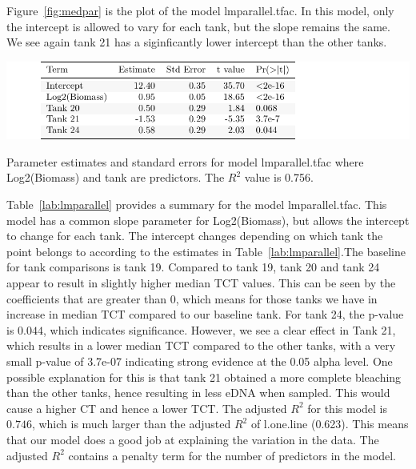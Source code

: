 Figure~\ref{fig:medpar} is the plot of the model  lmparallel.tfac. In this model, only the intercept is allowed to vary for each tank, but the slope remains the same. We see again tank 21 has a siginficantly lower intercept than the other tanks.


\vspace{5mm}

%

 \begin{table}[H]
\includegraphics{Chapter3Images/lmparallelkable.pdf}
\caption{Parameter estimates and standard errors for model  lmparallel.tfac where Log2(Biomass) and tank are predictors. The $R^{2}$ value is 0.756.}
\label{lab:lmparallel}
\end{table}



Table~\ref{lab:lmparallel} provides a summary for the model  lmparallel.tfac. This model has a common slope parameter for Log2(Biomass), but allows the intercept to change for each tank.  The intercept changes depending on which tank the point belongs to according to the estimates in Table~\ref{lab:lmparallel}.The baseline for tank comparisons is tank 19. Compared to tank 19, tank 20 and tank 24 appear to result in slightly higher median TCT values. This can be seen by the coefficients that are greater than 0, which means for those tanks we have in increase in median TCT compared to our baseline tank. For tank 24, the p-value is $0.044$, which indicates significance. However, we see a clear effect in Tank 21, which results in a lower median TCT compared to the other tanks, with a very small p-value of 3.7e-07 indicating strong evidence at the 0.05 alpha level. One possible explanation for this is that tank 21 obtained a more complete bleaching than the other tanks, hence resulting in less eDNA when sampled. This would cause a higher CT and hence a lower TCT.  The adjusted $R^{2}$ for this model is $0.746$, which is much larger than the adjusted $R^{2}$ of l.one.line (0.623). This means that our model does a good job at explaining the variation in the data. The adjusted $R^{2}$ contains a penalty term for the number of predictors in the model. 





